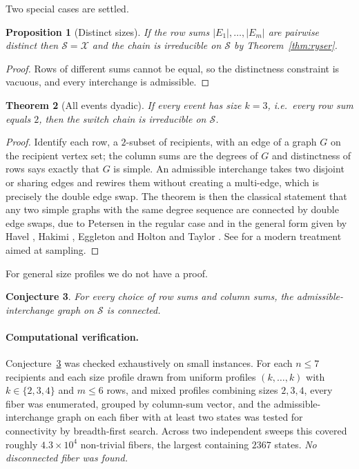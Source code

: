 \documentclass[11pt]{article}
\newtheorem{theorem}{Theorem}
\newtheorem{proposition}[theorem]{Proposition}
\newtheorem{conjecture}[theorem]{Conjecture}
\theoremstyle{definition}
\newcommand{\Xcal}{\mathcal{X}}
\newcommand{\Scal}{\mathcal{S}}
\begin{document}
Two special cases are settled.

\begin{proposition}[Distinct sizes]\label{prop:sizes}
If the row sums $|E_1|,\dots,|E_m|$ are pairwise distinct then $\Scal=\Xcal$ and
the chain is irreducible on $\Scal$ by Theorem~\ref{thm:ryser}.
\end{proposition}

\begin{proof}
Rows of different sums cannot be equal, so the distinctness constraint is
vacuous, and every interchange is admissible.
\end{proof}

\begin{theorem}[All events dyadic]\label{thm:size2}
If every event has size $k=3$, i.e.\ every row sum equals $2$, then the switch
chain is irreducible on $\Scal$.
\end{theorem}

\begin{proof}
Identify each row, a $2$-subset of recipients, with an edge of a graph $G$ on
the recipient vertex set; the column sums are the degrees of $G$ and
distinctness of rows says exactly that $G$ is simple. An admissible interchange
takes two disjoint or sharing edges and rewires them without creating a
multi-edge, which is precisely the double edge swap. The theorem is then the
classical statement that any two simple graphs with the same degree sequence are
connected by double edge swaps, due to Petersen \cite{petersen1891} in the
regular case and in the general form given by Havel \cite{havel1955}, Hakimi
\cite{hakimi1962}, Eggleton and Holton \cite{eggleton1979} and Taylor
\cite{taylor1981}. See \cite{fosdick2018} for a modern treatment aimed at
sampling.
\end{proof}

For general size profiles we do not have a proof.

\begin{conjecture}\label{conj:main}
For every choice of row sums and column sums, the admissible-interchange graph
on $\Scal$ is connected.
\end{conjecture}

\paragraph{Computational verification.}
Conjecture~\ref{conj:main} was checked exhaustively on small instances. For each
$n\le 7$ recipients and each size profile drawn from uniform profiles
$(k,\dots,k)$ with $k\in\{2,3,4\}$ and $m\le 6$ rows, and mixed profiles
combining sizes $2,3,4$, every fiber was enumerated, grouped by column-sum
vector, and the admissible-interchange graph on each fiber with at least two
states was tested for connectivity by breadth-first search. Across two
independent sweeps this covered roughly $4.3\times10^4$ non-trivial fibers, the
largest containing $2367$ states. \emph{No disconnected fiber was found.}
\end{document}
